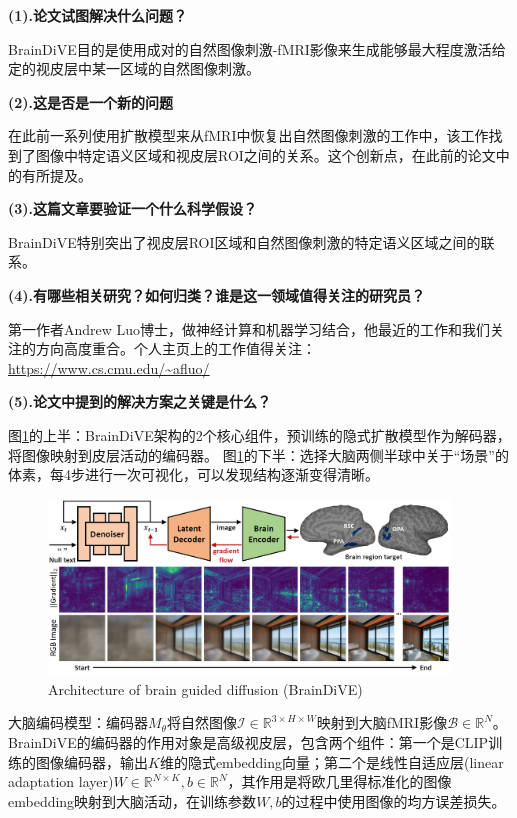 \documentclass[12pt, a4paper, oneside]{ctexart}
\begin{document}
    \noindent\textbf{(1).论文试图解决什么问题？}

    BrainDiVE目的是使用成对的自然图像刺激-fMRI影像来生成能够最大程度激活给定的视皮层中某一区域的自然图像刺激。

    \noindent\textbf{(2).这是否是一个新的问题}

    在此前一系列使用扩散模型来从fMRI中恢复出自然图像刺激的工作中，该工作找到了图像中特定语义区域和视皮层ROI之间的关系。这个创新点，在此前的论文中的有所提及。

    \noindent\textbf{(3).这篇文章要验证一个什么科学假设？}

    BrainDiVE特别突出了视皮层ROI区域和自然图像刺激的特定语义区域之间的联系。

    \noindent\textbf{(4).有哪些相关研究？如何归类？谁是这一领域值得关注的研究员？}

    第一作者Andrew Luo博士，做神经计算和机器学习结合，他最近的工作和我们关注的方向高度重合。个人主页上的工作值得关注：\url{https://www.cs.cmu.edu/~afluo/}

    \noindent\textbf{(5).论文中提到的解决方案之关键是什么？}

    图\ref{BrainDiVEarchitecture}的上半：BrainDiVE架构的2个核心组件，预训练的隐式扩散模型作为解码器，将图像映射到皮层活动的编码器。
    图\ref{BrainDiVEarchitecture}的下半：选择大脑两侧半球中关于“场景”的体素，每4步进行一次可视化，可以发现结构逐渐变得清晰。

    \begin{figure}[htbp]
        \centering
        \includegraphics[width=0.95\textwidth]{pic/4.11_BrainDiVE_Architecture.png}
        \caption{Architecture of brain guided diffusion (BrainDiVE)}
        \label{BrainDiVEarchitecture}
    \end{figure}

    大脑编码模型：编码器$M_\theta$将自然图像$\mathcal{I}\in{\mathbb{R}^{3\times{H}\times{W}}}$映射到大脑fMRI影像$\mathcal{B}\in{\mathbb{R}^{N}}$。BrainDiVE的编码器的作用对象是高级视皮层，包含两个组件：第一个是CLIP训练的图像编码器，输出$K$维的隐式embedding向量；第二个是线性自适应层(linear adaptation layer)$W\in{\mathbb{R}^{N\times{K}}},b\in{\mathbb{R}^{N}}$，其作用是将欧几里得标准化的图像embedding映射到大脑活动，在训练参数$W,b$的过程中使用图像的均方误差损失。
\end{document}
